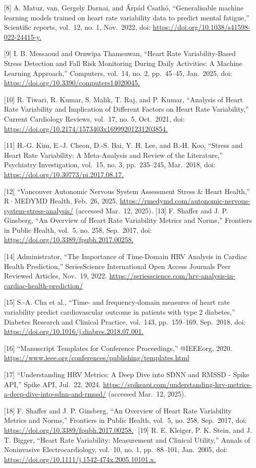 \documentclass[
  11pt,
]{ieee}
\begin{document}
{[}8{]} A. Matuz, van, Gergely Darnai, and Árpád Csathó, ``Generalisable
machine learning models trained on heart rate variability data to
predict mental fatigue,'' Scientific reports, vol.~12, no. 1, Nov.~2022,
doi: \url{https://doi.org/10.1038/s41598-022-24415-y.}

{[}9{]} I. B. Messaoud and Ornwipa Thamsuwan, ``Heart Rate
Variability-Based Stress Detection and Fall Risk Monitoring During Daily
Activities: A Machine Learning Approach,'' Computers, vol.~14, no. 2,
pp.~45--45, Jan.~2025, doi:
\url{https://doi.org/10.3390/computers14020045.}

{[}10{]} R. Tiwari, R. Kumar, S. Malik, T. Raj, and P. Kumar, ``Analysis
of Heart Rate Variability and Implication of Different Factors on Heart
Rate Variability,'' Current Cardiology Reviews, vol.~17, no. 5,
Oct.~2021, doi: \url{https://doi.org/10.2174/1573403x16999201231203854.}

{[}11{]} H.-G. Kim, E.-J. Cheon, D.-S. Bai, Y. H. Lee, and B.-H. Koo,
``Stress and Heart Rate Variability: A Meta-Analysis and Review of the
Literature,'' Psychiatry Investigation, vol.~15, no. 3, pp.~235--245,
Mar.~2018, doi: \url{https://doi.org/10.30773/pi.2017.08.17.}

{[}12{]} ``Vancouver Autonomic Nervous System Assessment \textbar{}
Stress \& Heart Health,'' R·MEDYMD Health, Feb.~26, 2025.
\url{https://rmedymd.com/autonomic-nervous-system-stress-analysis/}
(accessed Mar.~12, 2025). {[}13{]} F. Shaffer and J. P. Ginsberg, ``An
Overview of Heart Rate Variability Metrics and Norms,'' Frontiers in
Public Health, vol.~5, no. 258, Sep.~2017, doi:
\url{https://doi.org/10.3389/fpubh.2017.00258.}

{[}14{]} Administrator, ``The Importance of Time-Domain HRV Analysis in
Cardiac Health Prediction,'' SeriesScience International \textbar{} Open
Access Journals \textbar{} Peer Reviewed Articles, Nov.~19, 2022.
\url{https://seriesscience.com/hrv-analysis-in-cardiac-health-prediction/}

{[}15{]} S.-A. Cha et al., ``Time- and frequency-domain measures of
heart rate variability predict cardiovascular outcome in patients with
type 2 diabetes,'' Diabetes Research and Clinical Practice, vol.~143,
pp.~159--169, Sep.~2018, doi:
\url{https://doi.org/10.1016/j.diabres.2018.07.001.}

{[}16{]} ‌``Manuscript Templates for Conference Proceedings,'' @IEEEorg,
2020. \url{https://www.ieee.org/conferences/publishing/templates.html}

{[}17{]} ‌``Understanding HRV Metrics: A Deep Dive into SDNN and RMSSD -
Spike API,'' Spike API, Jul.~22, 2024.
\url{https://spikeapi.com/understanding-hrv-metrics-a-deep-dive-into-sdnn-and-rmssd/}
(accessed Mar.~12, 2025).

{[}18{]} F. Shaffer and J. P. Ginsberg, ``An Overview of Heart Rate
Variability Metrics and Norms,'' Frontiers in Public Health, vol.~5, no.
258, Sep.~2017, doi: \url{https://doi.org/10.3389/fpubh.2017.00258.} ‌
{[}19{]} R. E. Kleiger, P. K. Stein, and J. T. Bigger, ``Heart Rate
Variability: Measurement and Clinical Utility,'' Annals of Noninvasive
Electrocardiology, vol.~10, no. 1, pp.~88--101, Jan.~2005, doi:
\url{https://doi.org/10.1111/j.1542-474x.2005.10101.x.}
\end{document}

